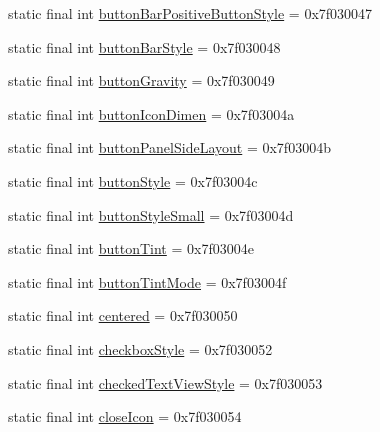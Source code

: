 \begin{DoxyCompactItemize}
\item 
static final int \mbox{\hyperlink{classcom_1_1synnapps_1_1carouselview_1_1_r_1_1attr_ab4141995bc708017b0c006bd9de4c29c}{button\+Bar\+Positive\+Button\+Style}} = 0x7f030047
\item 
static final int \mbox{\hyperlink{classcom_1_1synnapps_1_1carouselview_1_1_r_1_1attr_a77a14d1e764c83162c31ab9cb73ace48}{button\+Bar\+Style}} = 0x7f030048
\item 
static final int \mbox{\hyperlink{classcom_1_1synnapps_1_1carouselview_1_1_r_1_1attr_a9eb59c923f29ddebd5a85fb654631097}{button\+Gravity}} = 0x7f030049
\item 
static final int \mbox{\hyperlink{classcom_1_1synnapps_1_1carouselview_1_1_r_1_1attr_aa67e16b94fb80e26aa3b7eb227031581}{button\+Icon\+Dimen}} = 0x7f03004a
\item 
static final int \mbox{\hyperlink{classcom_1_1synnapps_1_1carouselview_1_1_r_1_1attr_afa375403cd3906c6ae40796b8ba99af8}{button\+Panel\+Side\+Layout}} = 0x7f03004b
\item 
static final int \mbox{\hyperlink{classcom_1_1synnapps_1_1carouselview_1_1_r_1_1attr_aa05ab8170018c8b797b1db9906d2d35c}{button\+Style}} = 0x7f03004c
\item 
static final int \mbox{\hyperlink{classcom_1_1synnapps_1_1carouselview_1_1_r_1_1attr_a04475fce4a398e8899476868d53ff505}{button\+Style\+Small}} = 0x7f03004d
\item 
static final int \mbox{\hyperlink{classcom_1_1synnapps_1_1carouselview_1_1_r_1_1attr_a0c25f0fc5dac73de53537640a10a4e1c}{button\+Tint}} = 0x7f03004e
\item 
static final int \mbox{\hyperlink{classcom_1_1synnapps_1_1carouselview_1_1_r_1_1attr_a12ddf4d6921cdfe64bbc4947a7520fbe}{button\+Tint\+Mode}} = 0x7f03004f
\item 
static final int \mbox{\hyperlink{classcom_1_1synnapps_1_1carouselview_1_1_r_1_1attr_a6669d8432286390fdac273372ae1c7fa}{centered}} = 0x7f030050
\item 
static final int \mbox{\hyperlink{classcom_1_1synnapps_1_1carouselview_1_1_r_1_1attr_aa3dd687eefc3d8ac4e7fceef6552f4ae}{checkbox\+Style}} = 0x7f030052
\item 
static final int \mbox{\hyperlink{classcom_1_1synnapps_1_1carouselview_1_1_r_1_1attr_a222c8fb3d5932da55b2d359ef51dfb0c}{checked\+Text\+View\+Style}} = 0x7f030053
\item 
static final int \mbox{\hyperlink{classcom_1_1synnapps_1_1carouselview_1_1_r_1_1attr_a978546b22edce2b8a40cdfd5c0be2d6d}{close\+Icon}} = 0x7f030054

\end{DoxyCompactItemize}
